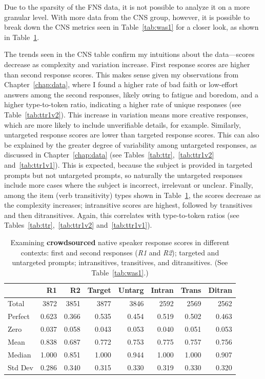 Due to the sparsity of the FNS data, it is not possible to analyze it on a more granular level. With more data from the CNS group, however, it is possible to break down the CNS metrics seen in Table~\ref{tab:was1} for a closer look, as shown in Table~\ref{tab:was2}.

The trends seen in the CNS table confirm my intuitions about the data---scores decrease as complexity and variation increase. First response scores are higher than second response scores. This makes sense given my observations from Chapter~\ref{chap:data}, where I found a higher rate of bad faith or low-effort answers among the second responses, likely owing to fatigue and boredom, and a higher type-to-token ratio, indicating a higher rate of unique responses (see Table~\ref{tab:ttr1v2}). This increase in variation means more creative responses, which are more likely to include unverifiable details, for example. Similarly, untargeted response scores are lower than targeted response scores. This can also be explained by the greater degree of variability among untargeted responses, as discussed in Chapter~\ref{chap:data} (see Tables~\ref{tab:ttr},~\ref{tab:ttr1v2} and~\ref{tab:ttr1v1}). This is expected, because the subject is provided in targeted prompts but not untargeted prompts, so naturally the untargeted responses include more cases where the subject is incorrect, irrelevant or unclear. Finally, among the item (verb transitivity) types shown in Table~\ref{tab:was2}, the scores decrease as the complexity increases; intransitive scores are highest, followed by transitives and then ditransitives. Again, this correlates with type-to-token ratios (see Tables~\ref{tab:ttr},~\ref{tab:ttr1v2} and~\ref{tab:ttr1v1}). 

\begin{table}[htb!]
\begin{center}
\begin{tabular}{|l||r|r||r|r||r|r|r|}
\hline
 & R1 & R2 & Target & Untarg & Intran & Trans & Ditran \\
\hline
\hline
Total & 3872 & 3851 & 3877 & 3846 & 2592 & 2569 & 2562 \\
\hline
\hline
Perfect & 0.623 & 0.366 & 0.535 & 0.454 & 0.519 & 0.502 & 0.463 \\
\hline
Zero  & 0.037 & 0.058 & 0.043 & 0.053 & 0.040 & 0.051 & 0.053  \\
\hline
\hline
Mean  & 0.838 & 0.687 & 0.772 & 0.753 & 0.775 & 0.757 & 0.756  \\
\hline
Median  & 1.000 & 0.851 & 1.000 & 0.944 & 1.000 & 1.000 & 0.907  \\
\hline
Std Dev  & 0.286 & 0.340 & 0.315 & 0.330 & 0.319 & 0.330 & 0.320  \\
\hline
\end{tabular}
\caption{\label{tab:was2} Examining \textbf{crowdsourced} native speaker response scores in different contexts: first and second responses (\textit{R1} and \textit{R2});  targeted and untargeted prompts; intransitives, transitives, and ditransitives. (See Table~\ref{tab:was1}.)}
\end{center}
\end{table}

